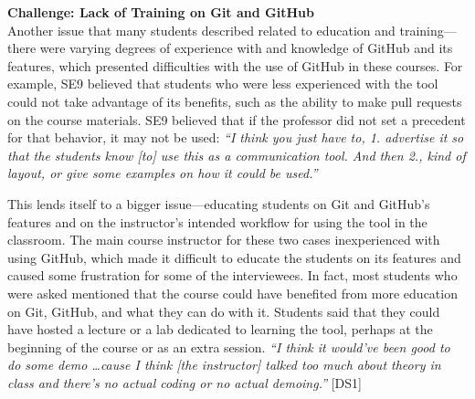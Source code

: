 

\textbf{Challenge: Lack of Training on Git and GitHub} \\
Another issue that many students described related to education and training---there were varying degrees of experience with and knowledge of GitHub and its features, which presented difficulties with the use of GitHub in these courses. For example, SE9 believed that students who were less experienced with the tool could not take advantage of its benefits, such as the ability to make pull requests on the course materials. SE9 believed that if the professor did not set a precedent for that behavior, it may not be used: \textit{``I think you just have to, 1. advertise it so that the students know [to] use this as a communication tool. And then 2., kind of layout, or give some examples on how it could be used.''}

This lends itself to a bigger issue---educating students on Git and GitHub's features and on the instructor's intended workflow for using the tool in the classroom. The main course instructor for these two cases inexperienced with using GitHub, which made it difficult to educate the students on its features and caused some frustration for some of the interviewees. In fact, most students who were asked mentioned that the course could have benefited from more education on Git, GitHub, and what they can do with it. Students said that they could have hosted a lecture or a lab dedicated to learning the tool, perhaps at the beginning of the course or as an extra session. \textit{``I think it would've been good to do some demo \ldots cause I think [the instructor] talked too much about theory in class and there's no actual coding or no actual demoing.''} [DS1]

